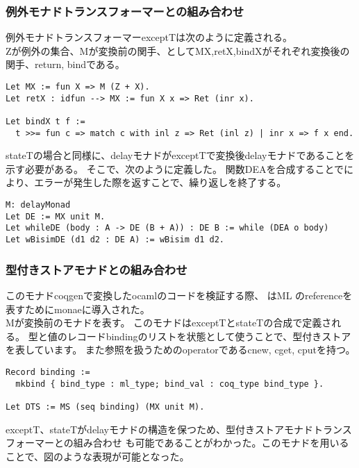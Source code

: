 \documentclass[japanese]{jssst_ppl}
\theoremstyle{definition}
\def\coqin#1{\text{\texttt{#1}}}
\begin{document}
\subsubsection{例外モナドトランスフォーマーとの組み合わせ}
例外モナドトランスフォーマーexceptTは次のように定義される。\\
Zが例外の集合、Mが変換前の関手、としてMX,retX,bindXがそれぞれ変換後の関手、return, bindである。

\begin{verbatim}
Let MX := fun X => M (Z + X).
Let retX : idfun --> MX := fun X x => Ret (inr x).

Let bindX t f :=
  t >>= fun c => match c with inl z => Ret (inl z) | inr x => f x end.
        \end{verbatim}
stateTの場合と同様に、delayモナドがexceptTで変換後delayモナドであることを示す必要がある。
そこで、次のように定義した。
関数DEAを合成することでにより、エラーが発生した際\coqin{inl (inl u)}を返すことで、繰り返しを終了する。

\begin{verbatim}
M: delayMonad
Let DE := MX unit M.
Let whileDE (body : A -> DE (B + A)) : DE B := while (DEA o body)
Let wBisimDE (d1 d2 : DE A) := wBisim d1 d2.
        \end{verbatim}

\subsubsection{型付きストアモナドとの組み合わせ}
このモナドcoqgenで変換したocamlのコードを検証する際、
はML のreferenceを表すためにmonaeに導入された。\\
Mが変換前のモナドを表す。
このモナドはexceptTとstateTの合成で定義される。
型と値のレコードbindingのリストを状態として使うことで、型付きストアを表しています。
また参照を扱うためのoperatorであるcnew, cget, cputを持つ。
\begin{verbatim}
Record binding :=
  mkbind { bind_type : ml_type; bind_val : coq_type bind_type }.

Let DTS := MS (seq binding) (MX unit M).
        \end{verbatim}

exceptT、stateTがdelayモナドの構造を保つため、型付きストアモナドトランスフォーマーとの組み合わせ
も可能であることがわかった。このモナドを用いることで、図のような表現が可能となった。
\end{document}
